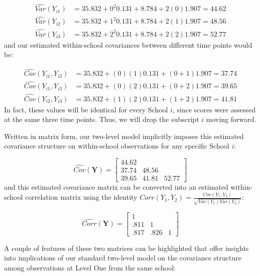 \documentclass[
]{krantz}
\begin{document}
\begin{align*}
\hat{Var}(Y_{i1}) & = 35.832 + 0^{2} 0.131 + 8.784 + 2(0)1.907 = 44.62 \\
\hat{Var}(Y_{i2}) & = 35.832 + 1^{2} 0.131 + 8.784 + 2(1)1.907 = 48.56 \\
\hat{Var}(Y_{i3}) & = 35.832 + 2^{2} 0.131 + 8.784 + 2(2)1.907 = 52.77
\end{align*}
\noindent and our estimated within-school covariances between different time points would be:

\begin{align*}
\hat{Cov}(Y_{i1},Y_{i2}) & = 35.832 + (0)(1)0.131 + (0+1)1.907 = 37.74 \\
\hat{Cov}(Y_{i1},Y_{i3}) & = 35.832 + (0)(2)0.131 + (0+2)1.907 = 39.65 \\
\hat{Cov}(Y_{i2},Y_{i3}) & = 35.832 + (1)(2)0.131 + (1+2)1.907 = 41.81
\end{align*}
In fact, these values will be identical for every School \(i\), since scores were assessed at the same three time points. Thus, we will drop the subscript \(i\) moving forward.

Written in matrix form, our two-level model implicitly imposes this estimated covariance structure on within-school observations for any specific School \(i\):

\[ \hat{Cov}(\mathbf{Y}) =  \left[
          \begin{array}{cccc}
            44.62 & &   \\
            37.74 & 48.56 &  \\
            39.65 & 41.81 & 52.77
          \end{array} \right] \]
and this estimated covariance matrix can be converted into an estimated within-school correlation matrix using the identity \(Corr(Y_{1},Y_{2})=\frac{Cov(Y_{1},Y_{2})}{\sqrt{Var(Y_{1}) Var(Y_{2})}}\):

\[ \hat{Corr}(\mathbf{Y}) =  \left[
          \begin{array}{cccc}
            1 & &   \\
            .811 & 1 &  \\
            .817 & .826 & 1
          \end{array} \right] \]

A couple of features of these two matrices can be highlighted that offer insights into implications of our standard two-level model on the covariance structure among observations at Level One from the same school:
\end{document}
